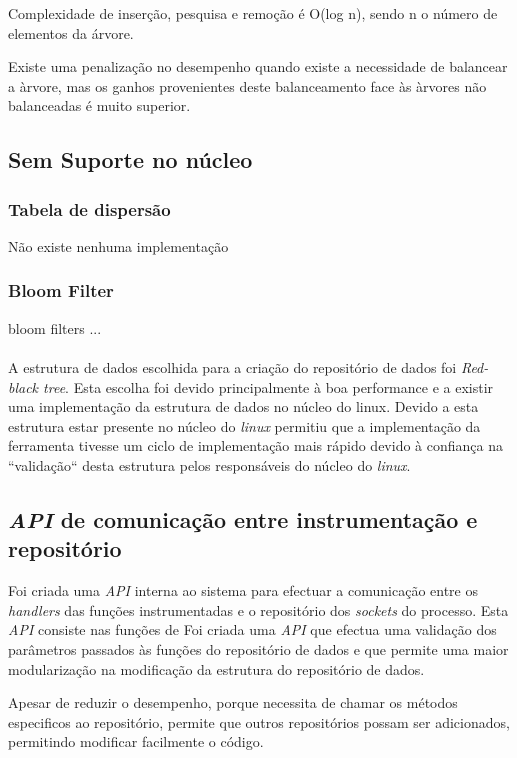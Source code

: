 Complexidade de inserção, pesquisa e remoção é O(log n), sendo n o número de elementos da árvore.

Existe uma penalização no desempenho quando existe a necessidade de balancear a àrvore, mas os ganhos provenientes deste balanceamento face às àrvores não balanceadas é muito superior.

\subsection{Sem Suporte no núcleo}

\subsubsection{Tabela de dispersão}
Não existe nenhuma implementação 

\subsubsection{Bloom Filter}
bloom filters ...

\paragraph*{}
A estrutura de dados escolhida para a criação do repositório de dados foi \textit{Red-black tree}.
 Esta escolha foi devido principalmente à boa performance e a existir uma implementação da estrutura de dados no núcleo do linux.
 Devido a esta estrutura estar presente no núcleo do \textit{linux} permitiu que a implementação da ferramenta tivesse um ciclo de implementação mais rápido devido à confiança na ``validação`` desta estrutura pelos responsáveis do núcleo do \textit{linux}.
 
\subsection{\textit{API} de comunicação entre instrumentação e repositório}

Foi criada uma \textit{API} interna ao sistema para efectuar a comunicação entre os \textit{handlers} das funções instrumentadas e o repositório dos \textit{sockets} do processo.
 Esta \textit{API} consiste nas funções de 
 Foi criada uma \textit{API} que efectua uma validação dos parâmetros passados às funções do repositório de dados e que permite uma maior modularização na modificação da estrutura do repositório de dados.

Apesar de reduzir o desempenho, porque necessita de chamar os métodos especificos ao repositório, permite que outros repositórios possam ser adicionados, permitindo modificar facilmente o código.

